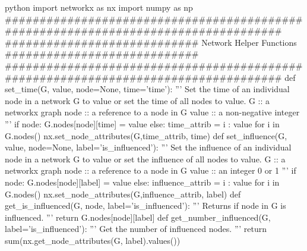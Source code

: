 \documentclass[10pt, oneside, reqno]{amsart}
\theoremstyle{plain}%
\theoremstyle{definition}
\theoremstyle{remark}
\begin{document}
\newpage 
\begin{mintedbox}{python}
import networkx as nx
import numpy as np
###################################################################################
############################ Network Helper Functions  ############################
###################################################################################
def set_time(G, value, node=None, time='time'):
    '''
        Set the time of an individual node in a network G 
        to value or set the time of all nodes to value.
        G      ::  a networkx graph
        node   ::  a reference to a node in G
        value  ::  a non-negative integer
    '''
    if node:
        G.nodes[node][time] = value
    else:
        time_attrib = {i : value for i in G.nodes()}
        nx.set_node_attributes(G,time_attrib, time)
def set_influence(G, value, node=None, label='is_influenced'):
    '''
        Set the influence of an individual node in a network G 
        to value or set the influence of all nodes to value.
        G      ::  a networkx graph
        node   ::  a reference to a node in G
        value  ::  an integer 0 or 1
    '''
    if node:
        G.nodes[node][label] = value
    else:
        influence_attrib = { i : value for i in G.nodes() }
        nx.set_node_attributes(G,influence_attrib, label)
def get_is_influenced(G, node, label='is_influenced'):
    '''
        Returns if node in G is influenced.
    '''
    return G.nodes[node][label]
def get_number_influenced(G, label='is_influenced'):
    '''
        Get the number of influenced nodes.
    '''
    return sum(nx.get_node_attributes(G, label).values())
\end{mintedbox}
\end{document}

